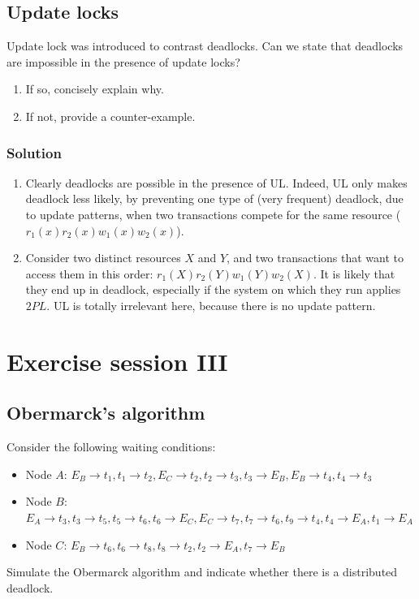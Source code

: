 \documentclass[12pt, a4paper]{report}
\newtheorem[style=M,bodystyle=\normalfont]{theorem}{Theorem}
\newtheorem[style=M,bodystyle=\normalfont]{corollary}{Corollary}
\newtheorem[style=M,bodystyle=\normalfont]{lemma}{Lemma}
\newtheorem[style=M,bodystyle=\normalfont]{definition}{Definition}
\begin{document}
    \newpage

    \section{Update locks}
        Update lock was introduced to contrast deadlocks. Can we state that deadlocks are impossible in the presence of update locks?
        \begin{enumerate}
            \item If so, concisely explain why. 
            \item If not, provide a counter-example.
        \end{enumerate}
    \subsection*{Solution}
        \begin{enumerate}
            \item Clearly deadlocks are possible in the presence of UL. Indeed, UL only makes deadlock less likely, by preventing one type of (very frequent) deadlock, due to 
                update patterns, when two transactions compete for the same resource ($r_1(x) r_2(x) w_1(x) w_2(x)$). 
            \item Consider two distinct resources $X$ and $Y$, and two transactions that want to access them in this order: $r_1(X) r_2(Y) w_1(Y) w_2(X)$. It is likely that they end up 
                in deadlock, especially if the system on which they run applies $2PL$. UL is totally irrelevant here, because there is no update pattern. 
        \end{enumerate}

\newpage

\chapter{Exercise session III}
    \section{Obermarck's algorithm}
        Consider the following waiting conditions:
        \begin{itemize}
            \item Node $A$: $E_B \rightarrow t_1, t_1 \rightarrow t_2, E_C \rightarrow t_2, t_2 \rightarrow t_3, t_3 \rightarrow E_B, E_B \rightarrow t_4, t_4 \rightarrow t_3$
            \item Node $B$: $E_A \rightarrow t_3, t_3 \rightarrow t_5, t_5 \rightarrow t_6, t_6 \rightarrow E_C, E_C \rightarrow t_7, t_7 \rightarrow t_6, t_9 \rightarrow t_4,t_4 \rightarrow E_A, t_1 \rightarrow E_A$
            \item Node $C$: $E_B \rightarrow t_6, t_6 \rightarrow t_8, t_8 \rightarrow t_2, t_2 \rightarrow E_A, t_7 \rightarrow E_B$
        \end{itemize}
        Simulate the Obermarck algorithm and indicate whether there is a distributed deadlock.
\end{document}
